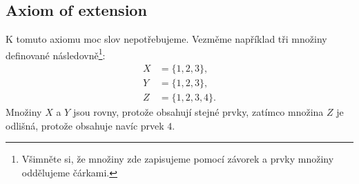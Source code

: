 \subsection{Axiom of extension}
K tomuto axiomu moc slov nepotřebujeme. Vezměme například tři množiny definované následovně\footnote{Všimněte si, že množiny zde zapisujeme pomocí závorek a prvky množiny oddělujeme čárkami.}:
\begin{align*}
  X &= \{1, 2, 3\},\\
  Y &= \{1, 2, 3\},\\
  Z &= \{1, 2, 3, 4\}.
\end{align*}
Množiny $X$ a $Y$ jsou rovny, protože obsahují stejné prvky, zatímco množina $Z$ je odlišná, protože obsahuje navíc prvek $4$.